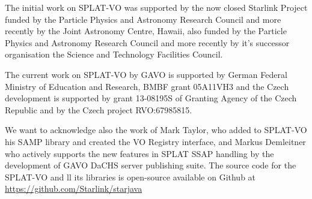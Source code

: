 \documentclass[final,authoryear,5p,times,twocolumn]{elsarticle}
\begin{document}
The initial work on SPLAT-VO was supported
by the now closed Starlink Project funded by the Particle Physics and
Astronomy Research Council and more recently by the Joint Astronomy
Centre, Hawaii, also funded by the Particle Physics and Astronomy
Research Council and more recently by it's successor organisation the
Science and Technology Facilities Council.

The current work on SPLAT-VO by GAVO is supported by German Federal
Ministry of Education and Research, BMBF grant 05A11VH3 and the Czech
development is supported by grant 13-08195S of Granting Agency of the
Czech Republic and by the Czech project RVO:67985815.

We want to acknowledge also the work of Mark Taylor, who added to
SPLAT-VO his SAMP library and created the VO Registry interface, and
Markus Demleitner who actively supports the new features in SPLAT SSAP
handling by the development of GAVO DaCHS server publishing suite.
The source code for the SPLAT-VO and ll its libraries is open-source
available on Github at  \url{https://github.com/Starlink/starjava}



\end{document}
